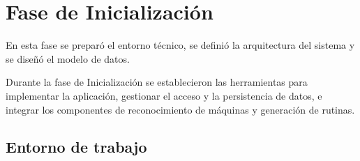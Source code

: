 \section{Fase de Inicialización}
\label{sec:des-inicializacion}

En esta fase se preparó el entorno técnico, se definió la arquitectura del
sistema y se diseñó el modelo de datos.

Durante la fase de Inicialización se establecieron las herramientas para implementar
la aplicación, gestionar el acceso y la persistencia de datos, e integrar
los componentes de reconocimiento de máquinas y generación de rutinas.

\subsection{Entorno de trabajo}

